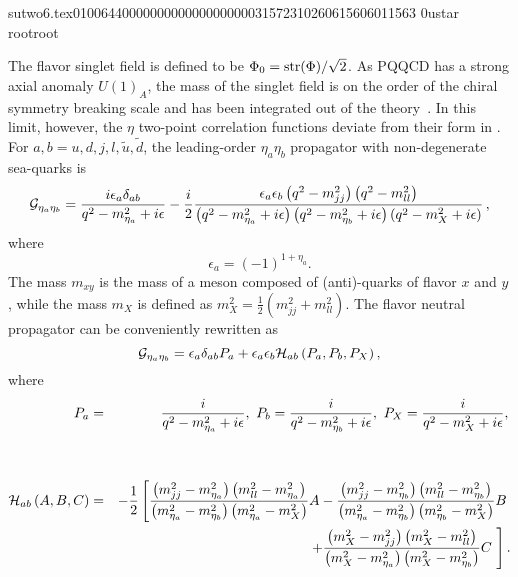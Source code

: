                                                                                                                                                                                                                                                                                       sutwo6.tex                                                                                          0100644 0000000 0000000 00000315723 10260615606 011563  0                                                                                                    ustar   root                            root                                                                                                                                                                                                                   \documentclass[prd,amssymb,amsmath,showpacs,nofootinbib,superscriptaddress]{revtex4}
\begin{document}
The flavor singlet field is defined to be $\Phi_0 = {\rm str}( \Phi ) /
{\sqrt 2}$.  As PQQCD has a strong axial anomaly $U(1)_A$, 
the mass of the singlet field is on the order of the chiral symmetry breaking scale 
and has been integrated out of the theory~\cite{Sharpe:2001fh}.  
In this limit, however, the $\eta$
two-point correlation functions deviate from their form in \CPT.
For $a,b = u,d,j,l,\tilde u, \tilde d$, 
the leading-order $\eta_a \eta_b$ propagator with non-degenerate 
sea-quarks is
\begin{equation}
{\cal G}_{\eta_a \eta_b} =
        \frac{i \epsilon_a \delta_{ab}}{q^2 - m^2_{\eta_a} +i\epsilon}
        - \frac{i}{2} \frac{\epsilon_a \epsilon_b \left(q^2 - m^2_{jj}
            \right) \left( q^2 - m^2_{ll} \right)}
            {\left(q^2 - m^2_{\eta_a} +i\epsilon \right)
             \left(q^2 - m^2_{\eta_b} +i\epsilon \right)
             \left(q^2 - m^2_X +i\epsilon \right)}\, ,
\end{equation}
where
\begin{equation}
\epsilon_a = (-1)^{1+\eta_a}
.\end{equation}
The mass $m_{xy}$ is the mass of a meson composed of (anti)-quarks
of flavor $x$ and $y$, while the mass $m_X$ is defined as $m_X^2 =
\frac{1}{2}\left(m^2_{jj} + m^2_{ll}\right)$.  The flavor neutral  
propagator can be conveniently rewritten as
\begin{equation}
{\cal G}_{\eta_a \eta_b} =
         {\epsilon}_a {\delta}_{ab} P_a +
         {\epsilon}_a {\epsilon}_b {\cal H}_{ab}\left(P_a,P_b,P_X\right),
\end{equation}
where
\begin{eqnarray}
     P_a &=& \frac{i}{q^2 - m^2_{\eta_a} +i\e},\ 
     P_b = \frac{i}{q^2 - m^2_{\eta_b} +i\e},\ 
     P_X = \frac{i}{q^2 - m^2_X +i\e}, \,
\nonumber\\
\nonumber\\
\nonumber\\
     {\cal H}_{ab}\left(A,B,C\right) &=& 
           -\frac{1}{2}\left[
             \frac{\left( m^2_{jj}-m^2_{\eta_a}\right)
                   \left( m^2_{ll}-m^2_{\eta_a}\right)}
                  {\left( m^2_{\eta_a} - m^2_{\eta_b}\right)
                   \left( m^2_{\eta_a} - m^2_X\right)}
                 A
            -\frac{\left( m^2_{jj}-m^2_{\eta_b}\right)
                   \left( m^2_{ll}-m^2_{\eta_b}\right)}
                  {\left( m^2_{\eta_a} - m^2_{\eta_b}\right)
                   \left( m^2_{\eta_b} - m^2_X\right)}
                 B \right.\, 
\nonumber\\
&&\qquad\quad\left.
            +\frac{\left( m^2_X-m^2_{jj}\right)
                   \left( m^2_X-m^2_{ll}\right)}
                  {\left( m^2_X-m^2_{\eta_a}\right)
                   \left( m^2_X-m^2_{\eta_b}\right)}
                 C\ \right].
\label{eq:Hfunction}
\end{eqnarray}
\end{document}
